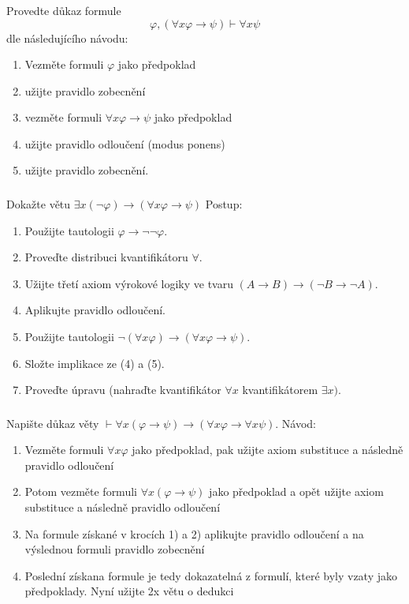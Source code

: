 \subsubsection{}
Provedte důkaz formule
$$\varphi ,(\forall x\varphi\rightarrow \psi )\vdash \forall x \psi$$
dle následujícího návodu:

\begin{enumerate}
  \item Vezměte formuli $\varphi$ jako předpoklad
  \item užijte pravidlo zobecnění
  \item vezměte formuli $\forall x \varphi \rightarrow \psi $ jako předpoklad
  \item užijte pravidlo odloučení (modus ponens)
  \item užijte pravidlo zobecnění.
\end{enumerate}
\subsubsection{}
Dokažte větu $\exists x(\neg \varphi) \rightarrow(\forall x \varphi \rightarrow
\psi)$ Postup:

\begin{enumerate}
  \item Použijte tautologii $\varphi \rightarrow \neg \neg \varphi$.
  \item Proveďte distribuci kvantifikátoru $\forall$.
  \item Užijte třetí axiom výrokové logiky ve tvaru $(A \rightarrow B)
  \rightarrow (\neg B \rightarrow \neg A)$.
  \item Aplikujte pravidlo odloučení.
  \item Použijte tautologii $\neg (\forall x \varphi) \rightarrow(\forall x \varphi \rightarrow
\psi)$.
  \item Složte implikace ze (4) a (5).
  \item Proveďte úpravu (nahraďte kvantifikátor $\forall x$ kvantifikátorem
  $\exists x)$.
\end{enumerate}
\subsubsection{}
Napište důkaz věty $\vdash \forall x (\varphi \rightarrow \psi) \rightarrow
(\forall x \varphi \rightarrow \forall x \psi)$. Návod:

\begin{enumerate}
  \item Vezměte formuli $\forall x \varphi$ jako předpoklad, pak užijte axiom substituce a
následně pravidlo odloučení
  \item Potom vezměte formuli $\forall x (\varphi \rightarrow \psi)$ jako předpoklad a opět užijte axiom
substituce a následně pravidlo odloučení
  \item Na formule získané v krocích 1) a 2) aplikujte pravidlo odloučení a na
výslednou formuli pravidlo zobecnění
  \item Poslední získana formule je tedy dokazatelná z formulí, které byly vzaty
jako předpoklady. Nyní užijte 2x větu o dedukci
\end{enumerate}
